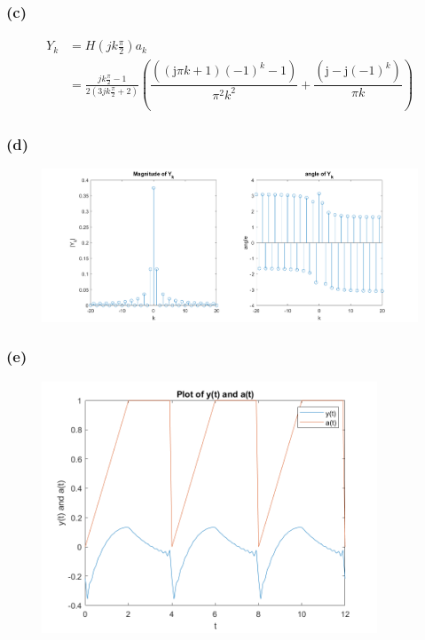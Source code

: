 \documentclass[12pt]{article}
\begin{document}
\subsubsection*{(c)}
\begin{align*}
Y_k&=H(jk\frac{\pi}{2})a_k\\
&=\boxed{\frac{jk\frac{\pi}{2}-1}{2(3jk\frac{\pi}{2}+2)}\left(\dfrac{\left(\left(\mathrm{j}{\pi}k+1\right)(-1)^k-1\right)}{{\pi}^2k^2}+\dfrac{\left(\mathrm{j}-\mathrm{j}(-1)^k\right)}{{\pi}k}\right)}
\end{align*}
\subsubsection*{(d)}

\begin{center}
\begin{figure}[h]\includegraphics[width=15cm]{fig9}
\end{figure}
\end{center}
\FloatBarrier
\subsubsection*{(e)}

\begin{center}
\begin{figure}[h]\includegraphics[width=10cm]{fig10}
\end{figure}
\end{center}
\FloatBarrier
\end{document}
